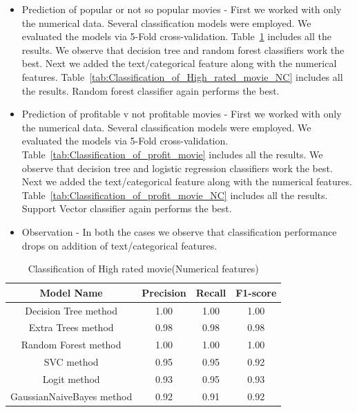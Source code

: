 \documentclass{article}%
\begin{document}
\begin{itemize}
\item Prediction of popular or not so popular movies - First we worked with only the numerical data. Several classification models were employed. We evaluated the models via 5-Fold cross-validation. Table~\ref{tab:Classification_of_High_rated_movie} includes all the results. We observe that decision tree and random forest classifiers work the best. Next we added the text/categorical feature along with the numerical features. Table~\ref{tab:Classification_of_High_rated_movie_NC} includes all the results. Random forest classifier again performs the best. 
\item Prediction of profitable v not profitable movies - First we worked with only the numerical data. Several classification models were employed. We evaluated the models via 5-Fold cross-validation. Table~\ref{tab:Classification_of_profit_movie} includes all the results. We observe that decision tree and logistic regression classifiers work the best. Next we added the text/categorical feature along with the numerical features. Table~\ref{tab:Classification_of_profit_movie_NC} includes all the results. Support Vector classifier again performs the best. 
\item Observation - In both the cases we observe that classification performance drops on addition of text/categorical features. 
\end{itemize}

\begin{table}[tb]
\caption{Classification of High rated movie(Numerical features)}
\label{tab:Classification_of_High_rated_movie}
\begin{center}
\footnotesize
\begin{tabular}{|c|c|c|c|} \hline
\textbf{Model Name}& \textbf{Precision}& \textbf{Recall} & \textbf{F1-score }   \\ \hline \hline
Decision Tree method &	1.00	& 1.00 &	1.00\\ \hline
Extra Trees method &	0.98	& 0.98 &	0.98\\ \hline
Random Forest method &	1.00	&1.00&	1.00\\ \hline
SVC method &	0.95	& 0.95 &	0.92\\ \hline
Logit method&	0.93&	0.95&	0.93\\ \hline
GaussianNaiveBayes method&	0.92	&0.91	&0.92\\ \hline

\end{tabular}
\end{center}
\end{table}
\end{document}
